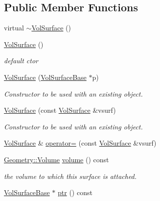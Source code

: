 \subsection*{Public Member Functions}
\begin{DoxyCompactItemize}
\item 
virtual \hyperlink{class_d_d4hep_1_1_d_d_rec_1_1_vol_surface_a2e875aa0d3e673d9c07f6047f3e7d0cb}{$\sim$\+Vol\+Surface} ()
\item 
\hyperlink{class_d_d4hep_1_1_d_d_rec_1_1_vol_surface_a4f1411058c69312c7107b4c5d5e5fc28}{Vol\+Surface} ()
\begin{DoxyCompactList}\small\item\em default c\textquotesingle{}tor \end{DoxyCompactList}\item 
\hyperlink{class_d_d4hep_1_1_d_d_rec_1_1_vol_surface_a95bfde0154e3651826df0760b2aba552}{Vol\+Surface} (\hyperlink{class_d_d4hep_1_1_d_d_rec_1_1_vol_surface_base}{Vol\+Surface\+Base} $\ast$p)
\begin{DoxyCompactList}\small\item\em Constructor to be used with an existing object. \end{DoxyCompactList}\item 
\hyperlink{class_d_d4hep_1_1_d_d_rec_1_1_vol_surface_adf64ad2a3576cca241d5f627e26c619c}{Vol\+Surface} (const \hyperlink{class_d_d4hep_1_1_d_d_rec_1_1_vol_surface}{Vol\+Surface} \&vsurf)
\begin{DoxyCompactList}\small\item\em Constructor to be used with an existing object. \end{DoxyCompactList}\item 
\hyperlink{class_d_d4hep_1_1_d_d_rec_1_1_vol_surface}{Vol\+Surface} \& \hyperlink{class_d_d4hep_1_1_d_d_rec_1_1_vol_surface_a3572914428d729854bc7c55466ddb788}{operator=} (const \hyperlink{class_d_d4hep_1_1_d_d_rec_1_1_vol_surface}{Vol\+Surface} \&vsurf)
\item 
\hyperlink{class_d_d4hep_1_1_geometry_1_1_volume}{Geometry\+::\+Volume} \hyperlink{class_d_d4hep_1_1_d_d_rec_1_1_vol_surface_adb270690e78edba67ae7da449ccfd7fd}{volume} () const
\begin{DoxyCompactList}\small\item\em the volume to which this surface is attached. \end{DoxyCompactList}\item 
\hyperlink{class_d_d4hep_1_1_d_d_rec_1_1_vol_surface_base}{Vol\+Surface\+Base} $\ast$ \hyperlink{class_d_d4hep_1_1_d_d_rec_1_1_vol_surface_ace0c5e55ea53b4d24aa0a3f63438f1db}{ptr} () const

\end{DoxyCompactItemize}
